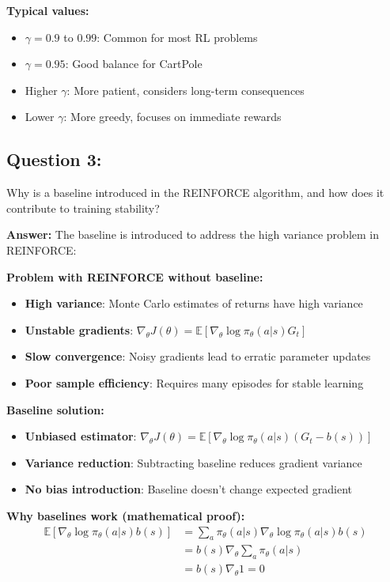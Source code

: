 \documentclass[12pt]{article}
\begin{document}
{{{\textbf{Typical values:}
\begin{itemize}
    \item $\gamma = 0.9$ to $0.99$: Common for most RL problems
    \item $\gamma = 0.95$: Good balance for CartPole
    \item Higher $\gamma$: More patient, considers long-term consequences
    \item Lower $\gamma$: More greedy, focuses on immediate rewards
\end{itemize}

\subsection{Question 3:}

Why is a baseline introduced in the REINFORCE algorithm, and how does it contribute to training stability?
\vspace*{0.3cm}

\textbf{Answer:} The baseline is introduced to address the high variance problem in REINFORCE:

\textbf{Problem with REINFORCE without baseline:}
\begin{itemize}
    \item \textbf{High variance}: Monte Carlo estimates of returns have high variance
    \item \textbf{Unstable gradients}: $\nabla_\theta J(\theta) = \mathbb{E}[\nabla_\theta \log \pi_\theta(a|s) G_t]$
    \item \textbf{Slow convergence}: Noisy gradients lead to erratic parameter updates
    \item \textbf{Poor sample efficiency}: Requires many episodes for stable learning
\end{itemize}

\textbf{Baseline solution:}
\begin{itemize}
    \item \textbf{Unbiased estimator}: $\nabla_\theta J(\theta) = \mathbb{E}[\nabla_\theta \log \pi_\theta(a|s) (G_t - b(s))]$
    \item \textbf{Variance reduction}: Subtracting baseline reduces gradient variance
    \item \textbf{No bias introduction}: Baseline doesn't change expected gradient
\end{itemize}

\textbf{Why baselines work (mathematical proof):}
\begin{align}
\mathbb{E}[\nabla_\theta \log \pi_\theta(a|s) b(s)] &= \sum_a \pi_\theta(a|s) \nabla_\theta \log \pi_\theta(a|s) b(s) \\
&= b(s) \nabla_\theta \sum_a \pi_\theta(a|s) \\
&= b(s) \nabla_\theta 1 = 0
\end{align}

}}}
\end{document}
